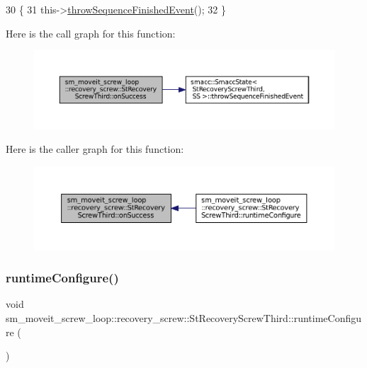 \begin{DoxyCode}
30             \{
31                 this->\hyperlink{classsmacc_1_1SmaccState_a49dcfc25824f7e083dd4b999c49ab2b6}{throwSequenceFinishedEvent}();
32             \}
\end{DoxyCode}
Here is the call graph for this function\+:
\nopagebreak
\begin{figure}[H]
\begin{center}
\leavevmode
\includegraphics[width=350pt]{structsm__moveit__screw__loop_1_1recovery__screw_1_1StRecoveryScrewThird_aac52f3cc2d70c30eeab123f065ac554f_cgraph}
\end{center}
\end{figure}
Here is the caller graph for this function\+:
\nopagebreak
\begin{figure}[H]
\begin{center}
\leavevmode
\includegraphics[width=350pt]{structsm__moveit__screw__loop_1_1recovery__screw_1_1StRecoveryScrewThird_aac52f3cc2d70c30eeab123f065ac554f_icgraph}
\end{center}
\end{figure}
\mbox{\label{structsm__moveit__screw__loop_1_1recovery__screw_1_1StRecoveryScrewThird_a1fec3d83026dafc61ab10973dfa3cd0f}} 
\subsubsection{\texorpdfstring{runtime\+Configure()}{runtimeConfigure()}}
{\footnotesize\ttfamily void sm\+\_\+moveit\+\_\+screw\+\_\+loop\+::recovery\+\_\+screw\+::\+St\+Recovery\+Screw\+Third\+::runtime\+Configure (\begin{DoxyParamCaption}{ }\end{DoxyParamCaption})\hspace{0.3cm}{\ttfamily [inline]}}



